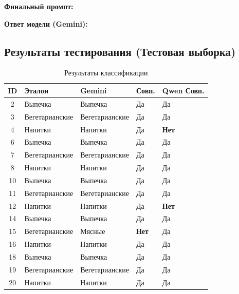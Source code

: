 \documentclass[oneside,a4paper,14pt]{extarticle} %
\begin{document}
		\noindent
		\textbf{Финальный промпт:}
		
		
		\noindent
		\textbf{Ответ модели (Gemini):}
		
		
		\subsection{Результаты тестирования (Тестовая выборка)}
		\begin{table}[H]
			\centering
			\caption{Результаты классификации}
			\begin{tabular}{|c|l|l|l|l|}
				\hline
				\textbf{ID} & \textbf{Эталон} & \textbf{Gemini} & \textbf{Совп.} & \textbf{Qwen Совп.} \\ \hline
				2 & Выпечка & Выпечка & Да & Да \\ \hline
				3 & Вегетарианские & Вегетарианские & Да & Да \\ \hline
				4 & Напитки & Напитки & Да & \textbf{Нет} \\ \hline
				6 & Выпечка & Выпечка & Да & Да \\ \hline
				7 & Вегетарианские & Вегетарианские & Да & Да \\ \hline
				8 & Напитки & Напитки & Да & Да \\ \hline
				10 & Выпечка & Выпечка & Да & Да \\ \hline
				11 & Вегетарианские & Вегетарианские & Да & Да \\ \hline
				12 & Напитки & Напитки & Да & \textbf{Нет} \\ \hline
				14 & Выпечка & Выпечка & Да & Да \\ \hline
				15 & Вегетарианские & Мясные & \textbf{Нет} & Да \\ \hline
				16 & Напитки & Напитки & Да & Да \\ \hline
				18 & Выпечка & Выпечка & Да & Да \\ \hline
				19 & Вегетарианские & Вегетарианские & Да & Да \\ \hline
				20 & Напитки & Напитки & Да & Да \\ \hline
			\end{tabular}
		\end{table}
		
\end{document}
